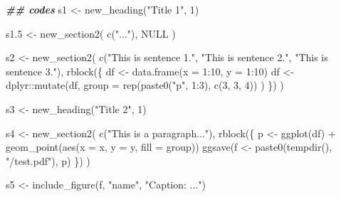 \documentclass[
]{article}
\newenvironment{Shaded}{\begin{snugshade}}{\end{snugshade}}
\newcommand{\AttributeTok}[1]{\textcolor[rgb]{0.77,0.63,0.00}{#1}}
\newcommand{\ConstantTok}[1]{\textcolor[rgb]{0.00,0.00,0.00}{#1}}
\newcommand{\DecValTok}[1]{\textcolor[rgb]{0.00,0.00,0.81}{#1}}
\newcommand{\DocumentationTok}[1]{\textcolor[rgb]{0.56,0.35,0.01}{\textbf{\textit{#1}}}}
\newcommand{\FloatTok}[1]{\textcolor[rgb]{0.00,0.00,0.81}{#1}}
\newcommand{\FunctionTok}[1]{\textcolor[rgb]{0.00,0.00,0.00}{#1}}
\newcommand{\NormalTok}[1]{#1}
\newcommand{\OtherTok}[1]{\textcolor[rgb]{0.56,0.35,0.01}{#1}}
\newcommand{\SpecialCharTok}[1]{\textcolor[rgb]{0.00,0.00,0.00}{#1}}
\newcommand{\StringTok}[1]{\textcolor[rgb]{0.31,0.60,0.02}{#1}}
\begin{document}
\begin{Shaded}
\begin{Highlighting}[]
\DocumentationTok{\#\# codes}
\NormalTok{s1 }\OtherTok{\textless{}{-}} \FunctionTok{new\_heading}\NormalTok{(}\StringTok{"Title 1"}\NormalTok{, }\DecValTok{1}\NormalTok{)}

\NormalTok{s1}\FloatTok{.5} \OtherTok{\textless{}{-}} \FunctionTok{new\_section2}\NormalTok{(}
  \FunctionTok{c}\NormalTok{(}\StringTok{"..."}\NormalTok{), }\ConstantTok{NULL}
\NormalTok{)}

\NormalTok{s2 }\OtherTok{\textless{}{-}} \FunctionTok{new\_section2}\NormalTok{(}
  \FunctionTok{c}\NormalTok{(}\StringTok{"This is sentence 1."}\NormalTok{,}
    \StringTok{"This is sentence 2."}\NormalTok{,}
    \StringTok{"This is sentence 3."}\NormalTok{),}
  \FunctionTok{rblock}\NormalTok{(\{}
\NormalTok{    df }\OtherTok{\textless{}{-}} \FunctionTok{data.frame}\NormalTok{(}\AttributeTok{x =} \DecValTok{1}\SpecialCharTok{:}\DecValTok{10}\NormalTok{, }\AttributeTok{y =} \DecValTok{1}\SpecialCharTok{:}\DecValTok{10}\NormalTok{)}
\NormalTok{    df }\OtherTok{\textless{}{-}}\NormalTok{ dplyr}\SpecialCharTok{::}\FunctionTok{mutate}\NormalTok{(df,}
      \AttributeTok{group =} \FunctionTok{rep}\NormalTok{(}\FunctionTok{paste0}\NormalTok{(}\StringTok{"p"}\NormalTok{, }\DecValTok{1}\SpecialCharTok{:}\DecValTok{3}\NormalTok{), }\FunctionTok{c}\NormalTok{(}\DecValTok{3}\NormalTok{, }\DecValTok{3}\NormalTok{, }\DecValTok{4}\NormalTok{))}
\NormalTok{    )}
\NormalTok{  \})}
\NormalTok{)}

\NormalTok{s3 }\OtherTok{\textless{}{-}} \FunctionTok{new\_heading}\NormalTok{(}\StringTok{"Title 2"}\NormalTok{, }\DecValTok{1}\NormalTok{)}

\NormalTok{s4 }\OtherTok{\textless{}{-}} \FunctionTok{new\_section2}\NormalTok{(}
  \FunctionTok{c}\NormalTok{(}\StringTok{"This is a paragraph..."}\NormalTok{),}
  \FunctionTok{rblock}\NormalTok{(\{}
\NormalTok{    p }\OtherTok{\textless{}{-}} \FunctionTok{ggplot}\NormalTok{(df) }\SpecialCharTok{+}
      \FunctionTok{geom\_point}\NormalTok{(}\FunctionTok{aes}\NormalTok{(}\AttributeTok{x =}\NormalTok{ x, }\AttributeTok{y =}\NormalTok{ y, }\AttributeTok{fill =}\NormalTok{ group))}
    \FunctionTok{ggsave}\NormalTok{(f }\OtherTok{\textless{}{-}} \FunctionTok{paste0}\NormalTok{(}\FunctionTok{tempdir}\NormalTok{(), }\StringTok{"/test.pdf"}\NormalTok{), p)}
\NormalTok{  \})}
\NormalTok{)}

\NormalTok{s5 }\OtherTok{\textless{}{-}} \FunctionTok{include\_figure}\NormalTok{(f, }\StringTok{"name"}\NormalTok{, }\StringTok{"Caption: ..."}\NormalTok{)}


\end{Highlighting}
\end{Shaded}
\end{document}
